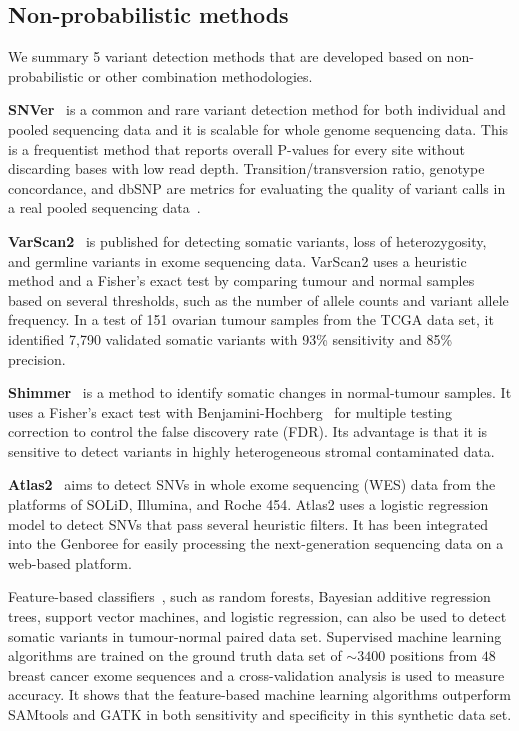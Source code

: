 \documentclass[a4,center,fleqn]{NAR}
\begin{document}
\subsection{Non-probabilistic methods}

We summary 5 variant detection methods that are developed based on non-probabilistic or other combination methodologies.

\textbf{SNVer}~\citep{Wei2011} is a common and rare variant detection method for both individual and pooled sequencing data and it is scalable for whole genome sequencing data.
This is a frequentist method that reports overall P-values for every site without discarding bases with low read depth.
Transition/transversion ratio, genotype concordance, and dbSNP are metrics for evaluating the quality of variant calls in a real pooled sequencing data~\citep{depristo2011framework}.

\textbf{VarScan2}~\citep{Koboldt2012} is published for detecting somatic variants, loss of heterozygosity, and germline variants in exome sequencing data.
VarScan2 uses a heuristic method and a Fisher's exact test by comparing tumour and normal samples based on several thresholds, such as the number of allele counts and variant allele frequency.
In a test of 151 ovarian tumour samples from the TCGA data set, it identified 7,790 validated somatic variants with 93\% sensitivity and 85\% precision.

\textbf{Shimmer}~\citep{Hansen2013} is a method to identify somatic changes in normal-tumour samples.
It uses a Fisher's exact test with Benjamini-Hochberg~\citep{benjamini1995controlling} for multiple testing correction to control the false discovery rate (FDR).
Its advantage is that it is sensitive to detect variants in highly heterogeneous stromal contaminated data.

\textbf{Atlas2}~\citep{challis2012integrative} aims to detect SNVs in whole exome sequencing (WES) data from the platforms of SOLiD, Illumina, and Roche 454.
Atlas2 uses a logistic regression model to detect SNVs that pass several heuristic filters.
It has been integrated into the Genboree for easily processing the next-generation sequencing data on a web-based platform.

Feature-based classifiers~\citep{Ding2012}, such as random forests, Bayesian additive regression trees, support vector machines, and logistic regression, can also be used to detect somatic variants in tumour-normal paired data set.
Supervised machine learning algorithms are trained on the ground truth data set of $\sim 3400$ positions from $48$ breast cancer exome sequences and a cross-validation analysis is used to measure accuracy.
It shows that the feature-based machine learning algorithms outperform SAMtools and GATK in both sensitivity and specificity in this synthetic data set.
\end{document}
